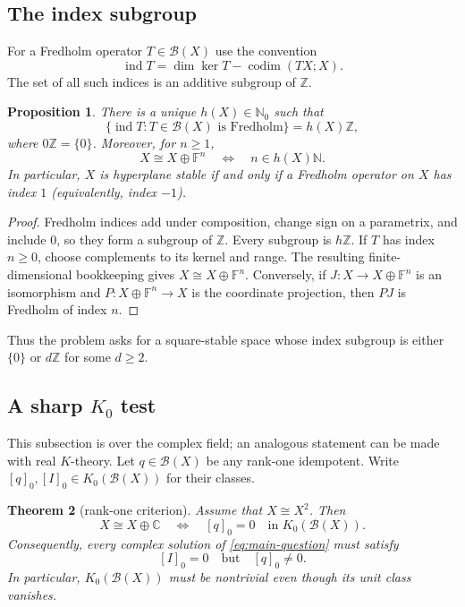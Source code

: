 \documentclass[11pt]{article}
\newtheorem{theorem}{Theorem}[section]
\newtheorem{proposition}[theorem]{Proposition}
\theoremstyle{definition}
\theoremstyle{remark}
\newcommand{\F}{\mathbb F}
\newcommand{\N}{\mathbb N}
\newcommand{\Z}{\mathbb Z}
\newcommand{\B}{\mathcal B}
\newcommand{\ind}{\operatorname{ind}}
\newcommand{\codim}{\operatorname{codim}}
\begin{document}
\subsection{The index subgroup}

For a Fredholm operator $T\in\B(X)$ use the convention
\[
 \ind T=\dim\ker T-\codim(TX;X).
\]
The set of all such indices is an additive subgroup of $\Z$.

\begin{proposition}\label{prop:index-subgroup}
There is a unique $h(X)\in\N_0$ such that
\[
 \{\ind T:T\in\B(X)\text{ is Fredholm}\}=h(X)\Z,
\]
where $0\Z=\{0\}$.  Moreover, for $n\ge1$,
\[
 X\cong X\oplus\F^n
 \quad\Longleftrightarrow\quad
 n\in h(X)\N.
\]
In particular, $X$ is hyperplane stable if and only if a Fredholm operator on
$X$ has index $1$ (equivalently, index $-1$).
\end{proposition}

\begin{proof}
Fredholm indices add under composition, change sign on a parametrix, and include
$0$, so they form a subgroup of $\Z$.  Every subgroup is $h\Z$.  If $T$ has
index $n\ge0$, choose complements to its kernel and range.  The resulting
finite-dimensional bookkeeping gives $X\cong X\oplus\F^n$.  Conversely, if
$J:X\to X\oplus\F^n$ is an isomorphism and $P:X\oplus\F^n\to X$ is the
coordinate projection, then $PJ$ is Fredholm of index $n$.
\end{proof}

Thus the problem asks for a square-stable space whose index subgroup is either
$\{0\}$ or $d\Z$ for some $d\ge2$.

\subsection{A sharp $K_0$ test}

This subsection is over the complex field; an analogous statement can be made
with real $K$-theory.  Let $q\in\B(X)$ be any rank-one idempotent.  Write
$[q]_0,[I]_0\in K_0(\B(X))$ for their classes.

\begin{theorem}[rank-one criterion]\label{thm:k0-criterion}
Assume that $X\cong X^2$.  Then
\[
 X\cong X\oplus\mathbb C
 \quad\Longleftrightarrow\quad
 [q]_0=0\quad\text{in }K_0(\B(X)).
\]
Consequently, every complex solution of \eqref{eq:main-question} must satisfy
\[
 [I]_0=0\quad\text{but}\quad[q]_0\ne0.
\]
In particular, $K_0(\B(X))$ must be nontrivial even though its unit class
vanishes.
\end{theorem}
\end{document}
